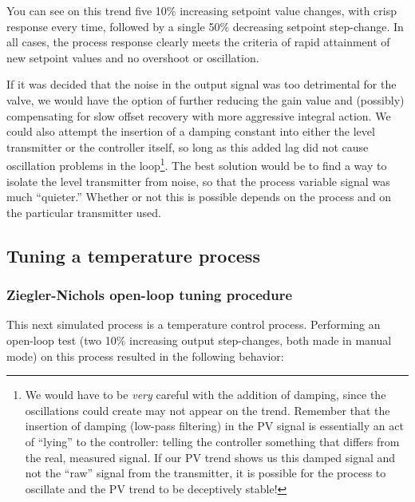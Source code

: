 You can see on this trend five 10\% increasing setpoint value changes, with crisp response every time, followed by a single 50\% decreasing setpoint step-change.  In all cases, the process response clearly meets the criteria of rapid attainment of new setpoint values and no overshoot or oscillation.

If it was decided that the noise in the output signal was too detrimental for the valve, we would have the option of further reducing the gain value and (possibly) compensating for slow offset recovery with more aggressive integral action.  We could also attempt the insertion of a damping constant into either the level transmitter or the controller itself, so long as this added lag did not cause oscillation problems in the loop\footnote{We would have to be \textit{very} careful with the addition of damping, since the oscillations could create may not appear on the trend.  Remember that the insertion of damping (low-pass filtering) in the PV signal is essentially an act of ``lying'' to the controller: telling the controller something that differs from the real, measured signal.  If our PV trend shows us this damped signal and not the ``raw'' signal from the transmitter, it is possible for the process to oscillate and the PV trend to be deceptively stable!}.  The best solution would be to find a way to isolate the level transmitter from noise, so that the process variable signal was much ``quieter.''  Whether or not this is possible depends on the process and on the particular transmitter used.









\filbreak
\subsection{Tuning a temperature process}

\subsubsection{Ziegler-Nichols open-loop tuning procedure}

This next simulated process is a temperature control process.  Performing an open-loop test (two 10\% increasing output step-changes, both made in manual mode) on this process resulted in the following behavior:

